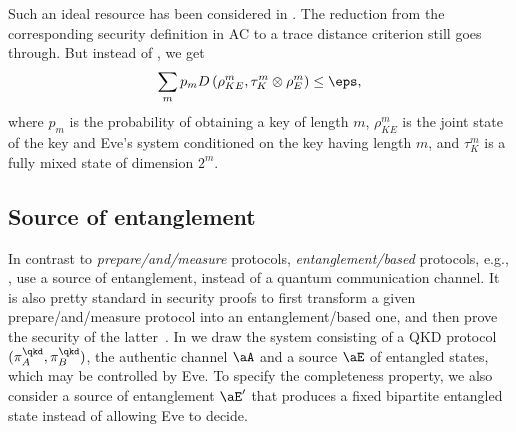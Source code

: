 Such an ideal resource has been considered in \textcite{BHLMO05,HT12}. The reduction from the corresponding security definition in AC to a trace distance criterion still goes through. But instead of , we get 
\begin{equation} \label{eq:adpative.trace.d}
\sum_m p_m D \left( \rho^m_{KE},\tau^m_K \otimes \rho^m_E \right) \leq
\eps,
\end{equation}
where $p_m$ is the probability of obtaining a key of length $m$, $\rho^m_{KE}$ is the joint state of the key and Eve's system conditioned on the key having length $m$,  and $\tau^m_K$ is a fully mixed state of dimension $2^m$.


\subsection{Source of entanglement}
\label{sec:alternative.entanglement}

In contrast to \emph{prepare\-/and\-/measure} protocols,
\emph{entanglement\-/based} protocols, e.g., \textcite{Eke91,BBM92},
use a source of entanglement, instead of a quantum communication
channel. It is also pretty standard in security proofs to first
transform a given prepare\-/and\-/measure protocol into an
entanglement\-/based one, and then prove the security of the
latter~\cite{SP00}. In  we draw the system
consisting of a QKD protocol $(\pi^{\qkd}_A,\pi^{\qkd}_B)$, the
authentic channel $\aA$ and a source  $\aE$ of entangled states, which may be
controlled by Eve. To specify the completeness property, we also consider
a source of entanglement $\aE'$ that produces a fixed bipartite
entangled state instead of allowing Eve to decide.

